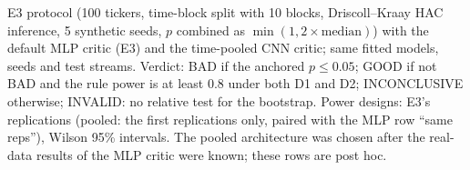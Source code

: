 E3 protocol (100 tickers, time-block split with 10 blocks, Driscoll--Kraay HAC inference, 5 synthetic seeds, $p$ combined as $\min(1, 2\times\mathrm{median})$) with the default MLP critic (E3) and the time-pooled CNN critic; same fitted models, seeds and test streams. Verdict: BAD if the anchored $p\le0.05$; GOOD if not BAD and the rule power is at least 0.8 under both D1 and D2; INCONCLUSIVE otherwise; INVALID: no relative test for the bootstrap. Power designs: E3's replications (pooled: the first replications only, paired with the MLP row ``same reps''), Wilson 95\% intervals. The pooled architecture was chosen after the real-data results of the MLP critic were known; these rows are post hoc.
